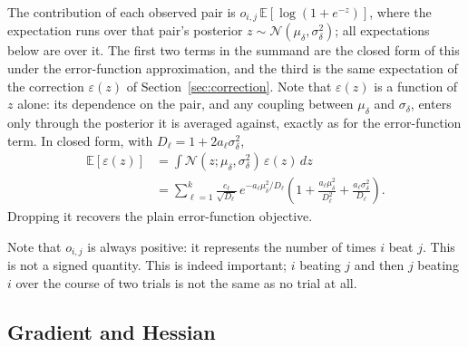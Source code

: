 \documentclass[12pt]{article}
\begin{document}
The contribution of each observed pair is $o_{i,j}\,\mathbb{E}[\log(1 + e^{-z})]$, where the expectation
runs over that pair's posterior $z \sim \mathcal{N}(\mu_\delta, \sigma_\delta^2)$; all expectations below
are over it. The first two terms in the summand are the closed form of this under the
error-function approximation, and the third is the same expectation of the correction $\varepsilon(z)$ of
Section~\ref{sec:correction}. Note that $\varepsilon(z)$ is a function of $z$ alone: its dependence on the
pair, and any coupling between $\mu_\delta$ and $\sigma_\delta$, enters only through the posterior it
is averaged against, exactly as for the error-function term. In closed form, with
$D_\ell = 1 + 2 a_\ell \sigma_\delta^2$,
\begin{align*}
\mathbb{E}\!\left[\varepsilon(z)\right]
&= \int \mathcal{N}(z; \mu_\delta, \sigma_\delta^2)\,\varepsilon(z)\,dz \\
&= \sum_{\ell=1}^{k} \frac{c_\ell}{\sqrt{D_\ell}}\,
e^{-a_\ell \mu_\delta^2 / D_\ell}\left(1 + \frac{a_\ell \mu_\delta^2}{D_\ell^2} + \frac{a_\ell \sigma_\delta^2}{D_\ell}\right).
\end{align*}
Dropping it recovers the plain error-function objective.

Note that $o_{i,j}$ is always positive: it represents the number of times $i$ beat $j$. This is not a signed quantity.
This is indeed important; $i$ beating $j$ and then $j$ beating $i$ over the course of two trials is not the same as no trial at all.


\subsection{Gradient and Hessian}
\label{sec:gradhess}
\end{document}
